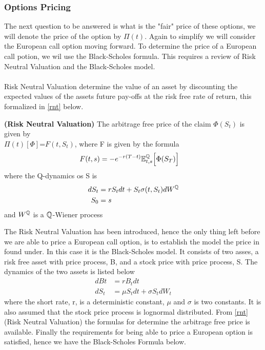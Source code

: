\subsubsection{Options Pricing}
The next question to be answered is what is the "fair" price of these options, we will denote the price of
the option by $\Pi(t)$. Again to simplify we will consider
the European call option moving forward. To determine the price of a European call potion, we wil use the 
Black-Scholes formula. This requires a review of Risk Neutral Valuation and the Black-Scholes model.
\\\\
Risk Neutral Valuation determine the value of an asset by discounting the expected values of the assets future 
pay-offs at the risk free rate of return, this formalized in \autoref{rnt} below.
\begin{theorem}
    \textbf{(Risk Neutral Valuation)} The arbitrage free price of the claim $\Phi(S_t)$ is given by \\
    $\Pi(t)[\Phi]$=$F(t,S_t)$, where F is given by the formula 
    \begin{align*}
        F(t,s) &= -e^{-r(T-t)} \mathbb{E}_{t,s}^{\mathbb{Q}} \Big[\Phi(S_T)\Big]
    \end{align*}
    where the Q-dynamics os S is
    \begin{align*}
        dS_t & = r S_t dt + S_t \sigma(t,S_t) dW^{\mathbb{Q}} \\
        S_0 & = s
    \end{align*}
    and $W^{\mathbb{Q}}$ is a $\mathbb{Q}$-Wiener process \cite{Bjork}
    \label{rnt}
\end{theorem}
\noindent 
The Risk Neutral Valuation has been introduced, hence the only thing left before we are able to price a 
European call option, is to establish the model the price in found under. In this case it is the Black-Scholes model.
It consists of two asses, a risk free asset with price process, B, and a stock price with price process, S.
The dynamics of the two assets is listed below
\begin{align*}
    dBt & = rB_t dt \\
    dS_t &= \mu S_t dt + \sigma S_t dW_t
\end{align*}
where the short rate, r, is  a deterministic constant,  $\mu$ and $\sigma$ is two constants. It is also assumed
that the stock price process is lognormal distributed. From \autoref{rnt}
(Risk Neutral Valuation) the formulas for determine the arbitrage free price is available. Finally the requirements
for being able to price a European option is satisfied, hence we have the Black-Scholes Formula below.
